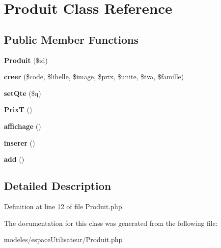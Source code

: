 \hypertarget{class_produit}{}\section{Produit Class Reference}
\label{class_produit}
\subsection*{Public Member Functions}
\begin{DoxyCompactItemize}
\item 
{\bfseries Produit} (\$id)\hypertarget{class_produit_a54fc53f9a5d52abc6bd01d49407bbc59}{}\label{class_produit_a54fc53f9a5d52abc6bd01d49407bbc59}

\item 
{\bfseries creer} (\$code, \$libelle, \$image, \$prix, \$unite, \$tva, \$famille)\hypertarget{class_produit_a0d59e9f34df513158ef95d0db4cf10be}{}\label{class_produit_a0d59e9f34df513158ef95d0db4cf10be}

\item 
{\bfseries set\+Qte} (\$q)\hypertarget{class_produit_a54ef84b5fc3879adc9b68c740780a497}{}\label{class_produit_a54ef84b5fc3879adc9b68c740780a497}

\item 
{\bfseries PrixT} ()\hypertarget{class_produit_ab76192c631dfe88ca6ee63a9fa15d1bc}{}\label{class_produit_ab76192c631dfe88ca6ee63a9fa15d1bc}

\item 
{\bfseries affichage} ()\hypertarget{class_produit_abeb1a856e0238e1f60b1f90d73ca6180}{}\label{class_produit_abeb1a856e0238e1f60b1f90d73ca6180}

\item 
{\bfseries inserer} ()\hypertarget{class_produit_aa04695ae21d9724e0483f0c30bee9e82}{}\label{class_produit_aa04695ae21d9724e0483f0c30bee9e82}

\item 
{\bfseries add} ()\hypertarget{class_produit_a837ba24a1c3095ae67613238d866f79a}{}\label{class_produit_a837ba24a1c3095ae67613238d866f79a}

\end{DoxyCompactItemize}


\subsection{Detailed Description}


Definition at line 12 of file Produit.\+php.



The documentation for this class was generated from the following file\+:\begin{DoxyCompactItemize}
\item 
modeles/espace\+Utilisateur/Produit.\+php\end{DoxyCompactItemize}
